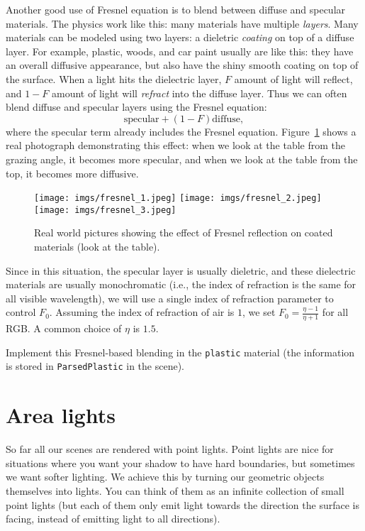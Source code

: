 Another good use of Fresnel equation is to blend between diffuse and specular materials. The physics work like this: many materials have multiple \emph{layers}. Many materials can be modeled using two layers: a dieletric \emph{coating} on top of a diffuse layer. For example, plastic, woods, and car paint usually are like this: they have an overall diffusive appearance, but also have the shiny smooth coating on top of the surface. When a light hits the dielectric layer, $F$ amount of light will reflect, and $1 - F$ amount of light will \emph{refract} into the diffuse layer. Thus we can often blend diffuse and specular layers using the Fresnel equation:
\begin{equation}
\text{specular} + (1 - F) \text{diffuse},
\end{equation}
where the specular term already includes the Fresnel equation. Figure~\ref{fig:real_world_fresnel} shows a real photograph demonstrating this effect: when we look at the table from the grazing angle, it becomes more specular, and when we look at the table from the top, it becomes more diffusive.
\begin{figure}[ht]
    \centering
    \texttt{[image: imgs/fresnel\_1.jpeg]}
    \texttt{[image: imgs/fresnel\_2.jpeg]}
    \texttt{[image: imgs/fresnel\_3.jpeg]}
    \caption{Real world pictures showing the effect of Fresnel reflection on coated materials (look at the table).}
    \label{fig:real_world_fresnel}
\end{figure}
Since in this situation, the specular layer is usually dieletric, and these dielectric materials are usually monochromatic (i.e., the index of refraction is the same for all visible wavelength), we will use a single index of refraction parameter to control $F_0$. Assuming the index of refraction of air is $1$, we set $F_0 = \frac{\eta - 1}{\eta + 1}$ for all RGB. A common choice of $\eta$ is $1.5$.

Implement this Fresnel-based blending in the \lstinline{plastic} material (the information is stored in \lstinline{ParsedPlastic} in the scene).

\section{Area lights}
So far all our scenes are rendered with point lights. Point lights are nice for situations where you want your shadow to have hard boundaries, but sometimes we want softer lighting. We achieve this by turning our geometric objects themselves into lights. You can think of them as an infinite collection of small point lights (but each of them only emit light towards the direction the surface is facing, instead of emitting light to all directions).



%
%


